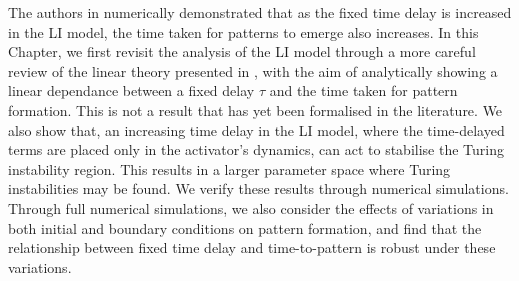 The authors in \cite{gaffmonk} numerically demonstrated that as the fixed time delay is increased in the LI model, the time taken for patterns to emerge also increases. In this Chapter, we first revisit the analysis of the LI model through a more careful review of the linear theory presented in \cite{yigaffneyli,jiang}, with the aim of analytically showing a linear dependance between a fixed delay $\tau$ and the time taken for pattern formation. This is not a result that has yet been formalised in the literature. We also show that, an increasing time delay in the LI model, where the time-delayed terms are placed only in the activator's dynamics, can act to stabilise the Turing instability region. This results in a larger parameter space where Turing instabilities may be found. We verify these results through numerical simulations. Through full numerical simulations, we also consider the effects of variations in both initial and boundary conditions on pattern formation, and find that the relationship between fixed time delay and time-to-pattern is robust under these variations.

